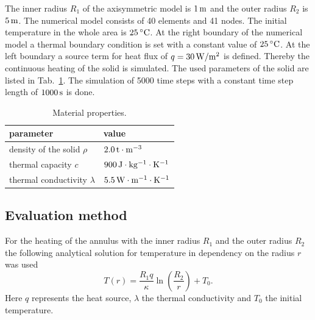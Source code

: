 The inner radius $R_1$ of the axisymmetric model is $\unit[1]{m}$ and the outer radius $R_2$ is $\unit[5]{m}$. The numerical model consists of 40 elements and 41 nodes. The initial temperature in the whole area is $\unit[25]{^{\circ}C}$. At the right boundary of the numerical model a thermal boundary condition is set with a constant value of $\unit[25]{^{\circ}C}$. At the left boundary a source term for heat flux of $q=\unit[30]{W/m^2}$ is defined. Thereby the continuous heating of the solid is simulated. The used parameters of the solid are listed in Tab.~\ref{tab11}. The simulation of 5000 time steps with a constant time step length of $\unit[1000]{s}$ is done.
\begin{table}[h]
\caption{\label{tab11}Material properties.}
\begin{center}
\begin{tabular}{ll}
\toprule
parameter 						& value \\
\midrule
density of the solid $\rho$ 	& $\unit[2.0]{t \cdot m^{-3}}$ \\			
thermal capacity $c$		    & $\unit[900]{J \cdot kg^{-1} \cdot K^{-1}}$ \\
thermal conductivity $\lambda$	& $\unit[5.5]{W \cdot m^{-1} \cdot K^{-1}}$ \\
\bottomrule
\end{tabular}
\end{center}
\end{table}

\subsection{Evaluation method}

For the heating of the annulus with the inner radius $R_1$ and the outer radius $R_2$ the following analytical solution for temperature in dependency on the radius $r$ was used
\begin{equation}
T(r) = \frac{R_1 q}{\kappa}\ln\left(\frac{R_2}{r}\right) + T_0.
\label{eq11}
\end{equation}
Here $q$ represents the heat source, $\lambda$ the thermal conductivity and $T_0$ the initial temperature.

